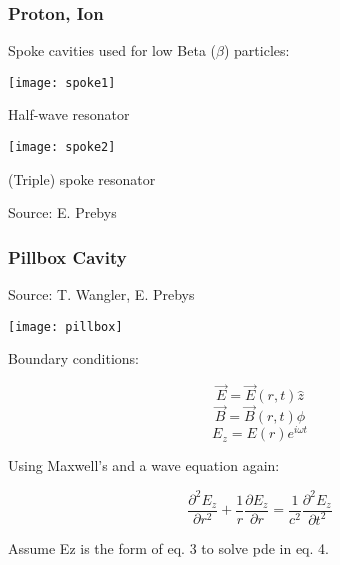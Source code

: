 \documentclass[professionalfonts,t]{beamer}
\begin{document}
\begin{frame}
\frametitle{Proton, Ion}
Spoke cavities used for low Beta ($\beta$) particles:
\vspace{0.25em}

\centering
\begin{minipage}{0.45\textwidth}
	\centering
	\texttt{[image: spoke1]}
	
	Half-wave resonator
\end{minipage}\hspace{-1em}
\begin{minipage}{0.5\textwidth}
	\centering
	\texttt{[image: spoke2]}
	
	(Triple) spoke resonator
\end{minipage}

\vspace{1em}
\hfill Source: E. Prebys
\end{frame}


\begin{frame}
\frametitle{Pillbox Cavity}
\vspace{-2em}
\hfill Source: T. Wangler, E. Prebys

\begin{minipage}{0.6\textwidth}
	\texttt{[image: pillbox]}
	
	Boundary conditions: 
\end{minipage}
\begin{minipage}{0.34\textwidth}
	\begin{equation}
	\vec{E} = \vec{E}\left(r,t\right)\hat{z}
	\end{equation}
	\begin{equation}
	\vec{B} = \vec{B}\left(r,t\right)\hat{\phi}
	\end{equation}
	\begin{equation}
		E_z = E \left(r\right) e^{i \omega t}
	\end{equation}
\end{minipage}

Using Maxwell's and a wave equation again:

\begin{equation}
\frac{\partial^2 E_z}{\partial r^2} + \frac{1}{r} \frac{\partial E_z}{\partial r} = \frac{1}{c^2} \frac{\partial^2 E_z}{\partial t^2}
\end{equation}

Assume Ez is the form of eq. 3 to solve pde in eq. 4.  
\end{frame}
\end{document}
